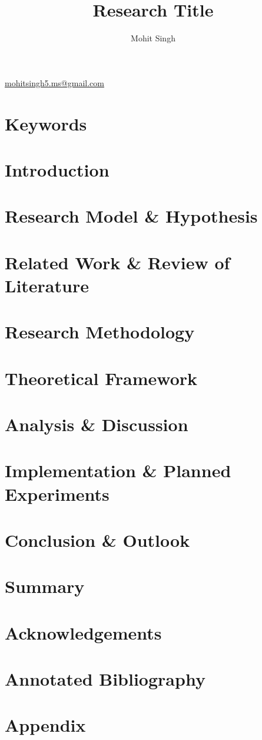 \documentclass[12pt, a4paper]{article}
\title{Research Title}
\author{Mohit Singh}
\begin{document}
	\maketitle
	\href{mailto:mohitsingh5.ms@gmail.com}{mohitsingh5.ms@gmail.com}
	\begin{abstract}
		
	\end{abstract}
	\section*{Keywords}
	\begin{multicols}{2}
		\section{Introduction}
		\section{Research Model \& Hypothesis}
		\section{Related Work \& Review of Literature}
		\section{Research Methodology}
		\section{Theoretical Framework}
		\section{Analysis \& Discussion}
		\section{Implementation \& Planned Experiments}
		\section{Conclusion \& Outlook}
	\end{multicols}
	\section*{Summary}
	\section*{Acknowledgements}
	
	
	\section*{Annotated Bibliography}
	\appendix
	\section*{Appendix}
\end{document}
